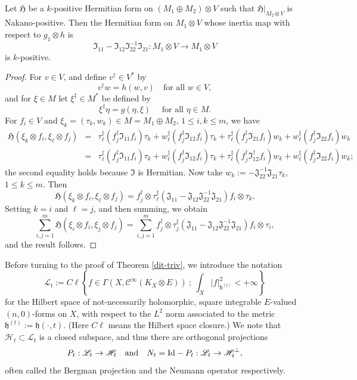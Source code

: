 \documentclass[12pt,hidelinks]{amsart}
\newcommand{\sC}{{\mathscr C}}
\newcommand{\sH}{{\mathscr H}}
\newcommand{\sL}{{\mathscr L}}
\newcommand{\fH}{{\mathfrak H}}
\newcommand{\fI}{\mathfrak{I}}
\newcommand{\fJ}{{\mathfrak J}}
\newcommand{\fh}{{\mathfrak h}}
\newcommand{\tensor}{\otimes}
\begin{document}
\begin{prop}\label{positivity-of-dets}
Let $\fH$ be a $k$-positive Hermitian form on $(M_1 \oplus M_2) \tensor V$ such that $\fH|_{M_2 \tensor V}$ is Nakano-positive.  Then the Hermitian form on $M_1 \tensor V$ whose inertia map with respect to $g_1 \tensor h$ is
\[
\fI _{11} - \fI_{12} \fI_{22}^{-1} \fI _{21} : M_1 \tensor V \to M_1 \tensor V
\]
is $k$-positive.
\end{prop}

\begin{proof}
For $v\in V$, and define $v^{\dagger} \in V^*$ by 
\[
v^\dagger w = h(w,v) \quad \text{for all }w \in V,
\]
and for $\xi \in M$ let $\xi^{\ddagger} \in M^*$ be defined by 
\[
\xi ^\ddagger \eta = g(\eta,\xi) \quad \text{ for all }\eta \in M.
\]
For $f_i \in V$ and $\xi_k= (\tau_k, w_k) \in M = M_1 \oplus M_2$, $1 \le i,k \le m$,  we have 
\begin{eqnarray*}
\fH (\xi _k \tensor f_i, \xi _{\ell} \tensor f_j) &=& \tau _{\ell} ^{\ddagger} \left (f_j ^{\dagger} \fI _{11} f_i\right ) \tau _k  +  w_{\ell} ^{\ddagger} \left (f_j ^{\dagger} \fI _{12} f_i\right ) \tau _k +  \tau_{\ell} ^{\ddagger} \left (f_j ^{\dagger} \fI _{21} f_i\right ) w _k +  w_{\ell} ^{\ddagger} \left (f_j ^{\dagger} \fI _{22} f_i\right ) w_k \\
&=& \tau _{\ell} ^{\ddagger} \left (f_j ^{\dagger} \fI _{11} f_i\right ) \tau _k  +  w_{\ell} ^{\ddagger} \left (f_j ^{\dagger} \fI _{12} f_i\right ) \tau _k +  \tau_{\ell} ^{\ddagger} \left (f_j ^{\dagger} \fI _{12}^{\dagger} f_i\right ) w _k +  w_{\ell} ^{\ddagger} \left (f_j ^{\dagger} \fI _{22} f_i\right ) w_k;
\end{eqnarray*}
the second equality holds because $\fI$ is Hermitian.  Now take $w_k := - \fJ_{22} ^{-1} \fJ_{21} \tau _k$, $1 \le k \le m$.  Then 
\[
\fH (\xi _k \tensor f_i,\xi _{\ell} \tensor f_j) = f_j^{\dagger} \tensor \tau _{\ell} ^{\ddagger} \left ( \fJ _{11} - \fJ_{12} \fJ_{22} ^{-1} \fJ_{21} \right ) f_i \tensor \tau _k.
\]
Setting $k=i$ and $\ell = j$, and then summing, we obtain 
\[
\sum _{i,j=1} ^m \fH (\xi _i \tensor f_i,\xi _{j} \tensor f_j)= \sum _{i,j=1} ^m f_j^{\dagger} \tensor \tau _{j} ^{\ddagger} \left ( \fJ _{11} - \fJ_{12} \fJ_{22} ^{-1} \fJ_{21} \right ) f_i \tensor \tau _i,
\]
and the result follows.
\end{proof}

Before turning to the proof of Theorem \ref{dit-triv}, we introduce the notation 
\[
\sL _t := C\ell \left \{ f \in \Gamma (X, \sC^{\infty}(K_X \tensor E))\ ;\ \int _X |f|^2_{\fh ^{(t)}} < +\infty \right \}
\]
for the Hilbert space of not-necessarily holomorphic, square integrable $E$-valued $(n,0)$-forms on $X$, with respect to the $L^2$ norm associated to the metric $\fh^{(t)} := \fh (\cdot, t)$.  (Here $C\ell$ means the Hilbert space closure.)  We note that $\sH _t \subset \sL_t$ is a closed subspace, and thus there are orthogonal projections 
\[
P_t : \sL _t \to \sH_t \quad \text{and} \quad N_t = {\rm Id} - P_t: \sL _t \to \sH_t ^{\perp},
\]
often called the Bergman projection and the Neumann operator respectively.  
\end{document}
